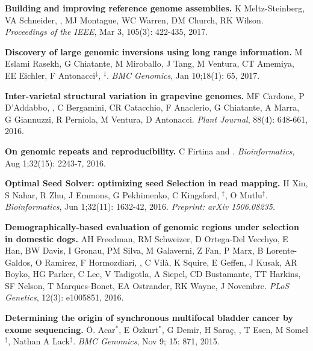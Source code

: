          
  \vspace{-.2cm}        
         {\bf Building and improving reference genome assemblies.} K Meltz-Steinberg, VA Schneider, \calkan{}, MJ Montague, WC Warren, DM Church, RK Wilson.
         {\em Proceedings of the IEEE}, Mar 3, 105(3): 422-435, 2017.


  \vspace{-.2cm}        
         {\bf Discovery of large genomic inversions using long
range information.} M Eslami Rasekh, G Chiatante, M Miroballo, J Tang, M Ventura, CT Amemiya, EE Eichler, F Antonacci$^\ddag$, \calkan{}$^\ddag$.
         {\em BMC Genomics}, Jan 10;18(1): 65, 2017.

  \vspace{-.2cm}        
  {\bf Inter-varietal structural variation in grapevine genomes.}
 MF Cardone, P D'Addabbo, \calkan{}, C Bergamini, CR Catacchio, F Anaclerio, G Chiatante, A Marra, G Giannuzzi, R Perniola, M Ventura, D Antonacci.
 {\em Plant Journal}, 88(4): 648-661, 2016.

  \vspace{-.2cm}        
  {\bf On genomic repeats and reproducibility.}
  C Firtina and \calkan{}.
 {\em Bioinformatics}, Aug 1;32(15): 2243-7, 2016.

  \vspace{-.2cm}        
  {\bf Optimal Seed Solver: optimizing seed Selection in read mapping.}
  H Xin, S Nahar, R Zhu, J Emmons, G Pekhimenko, C Kingsford, \calkan{}$^\ddag$, O Mutlu$^\ddag$.
 {\em Bioinformatics}, Jun 1;32(11): 1632-42, 2016. \textit{Preprint: arXiv 1506.08235.}


  \vspace{-.2cm}        
  {\bf Demographically-based evaluation of genomic regions under selection in domestic dogs.}
AH Freedman, RM Schweizer, D Ortega-Del Vecchyo, E Han, BW Davis, I Gronau, PM Silva, M Galaverni, Z Fan, P Marx, B Lorente-Galdos, O Ramirez, F Hormozdiari, \calkan{}, C Vilà, K Squire, 
E Geffen, J Kusak, AR Boyko, HG Parker, C Lee, V Tadigotla, A Siepel, CD Bustamante, TT Harkins, SF Nelson, T Marques-Bonet, EA Ostrander, RK Wayne, J Novembre.
 {\em PLoS Genetics}, 12(3): e1005851, 2016.

  \vspace{-.2cm}        
  {\bf Determining the origin of synchronous multifocal bladder cancer by exome sequencing.} 
  Ö. Acar$^*$, E Özkurt$^*$, G Demir, H Saraç, \calkan{}, T Esen, M Somel$^\ddag$, Nathan A Lack$^\ddag$.
 {\em BMC Genomics}, Nov 9; 15: 871, 2015.

